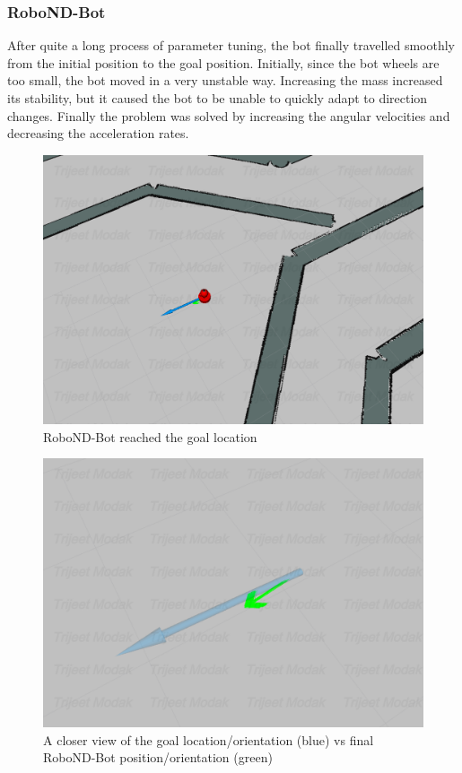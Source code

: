 \documentclass[10pt,journal,compsoc]{IEEEtran}
\begin{document}
\subsubsection{RoboND-Bot}
After quite a long process of parameter tuning, the bot finally travelled smoothly from the initial position to the goal position. Initially, since the bot wheels are too small, the bot moved in a very unstable way. Increasing the mass increased its stability, but it caused the bot to be unable to quickly adapt to direction changes. Finally the problem was solved by increasing the angular velocities and decreasing the acceleration rates.

\begin{figure}[h]
    \centering
    \includegraphics[scale=0.225]{imgs/robond-bot-goal.png}
    \centering
    \caption{RoboND-Bot reached the goal location}
    \label{fig:robond-bot-goal}
\end{figure}



\begin{figure}[h]
    \centering
    \includegraphics[scale=0.225]{imgs/robond-goal-orientation.png}
    \centering
    \caption{A closer view of the goal location/orientation (blue) vs final RoboND-Bot position/orientation (green)}
    \label{fig:robond-goal-orientation}
\end{figure}
\end{document}

